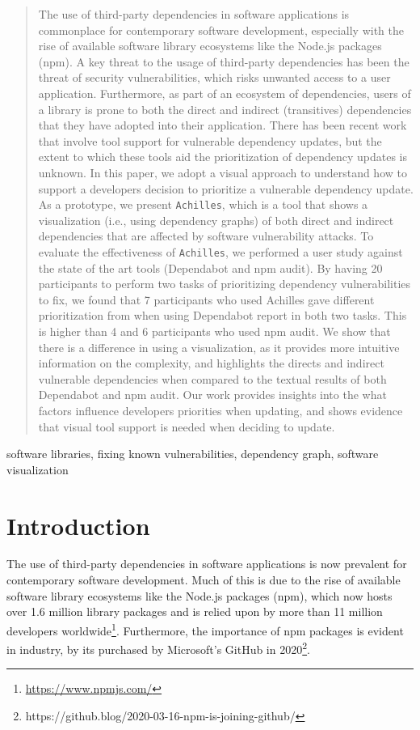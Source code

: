 \documentclass[conference]{IEEEtran}
\begin{document}
	\begin{abstract}
		The use of third-party dependencies in software applications is commonplace for contemporary software development, especially with the rise of available software library ecosystems like the Node.js packages (npm). 
		A key threat to the usage of third-party dependencies has been the threat of security vulnerabilities, which risks unwanted access to a user application. 
		Furthermore, as part of an ecosystem of dependencies, users of a library is prone to both the direct and indirect (transitives) dependencies that they have adopted into their application. 
		There has been recent work that involve tool support for vulnerable dependency updates, but the extent to which these tools aid the prioritization of dependency updates is unknown. 
		In this paper, we adopt a visual approach to understand how to support a developers decision to prioritize a vulnerable dependency update.
		As a prototype, we present \texttt{Achilles}, which is a tool that shows a visualization (i.e., using dependency graphs) of both direct and indirect dependencies that are affected by software vulnerability attacks.
		To evaluate the effectiveness of \texttt{Achilles}, we performed a user study against the state of the art tools (Dependabot and npm audit). 
		By having 20 participants to perform two tasks of prioritizing dependency vulnerabilities to fix, we found that 7 participants who used Achilles gave different prioritization from when using Dependabot report in both two tasks. This is higher than 4 and 6 participants who used npm audit.
		We show that there is a difference in using a visualization, as it provides more intuitive information on the complexity, and highlights the directs and indirect vulnerable dependencies when compared to the textual results of both Dependabot and npm audit.
		Our work provides insights into the what factors influence developers priorities when updating, and shows evidence that visual tool support is needed when deciding to update.
	\end{abstract}
	
	\begin{IEEEkeywords}
		software libraries, fixing known vulnerabilities, dependency graph, software visualization
	\end{IEEEkeywords}
	
	\section{Introduction}
	The use of third-party dependencies in software applications is now prevalent for contemporary software development. 
	Much of this is due to the rise of available software library ecosystems like the Node.js packages (npm), which now hosts over 1.6 million library packages and is relied upon by more than 11 million developers worldwide\footnote{\url{https://www.npmjs.com/}}.
	Furthermore, the importance of npm packages is evident in industry, by its purchased by Microsoft's GitHub in 2020\footnote{https://github.blog/2020-03-16-npm-is-joining-github/}.
	
\end{document}
